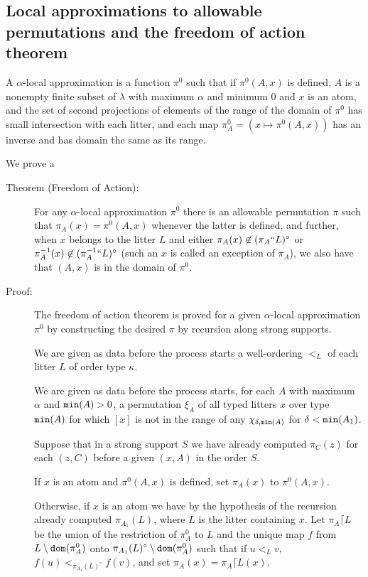 \documentclass[12pt]{article}
\begin{document}
\subsection{Local approximations to allowable permutations and the freedom of action theorem}

A $\alpha$-local approximation is a function $\pi^0$ such that if $\pi^0(A,x)$ is defined, $A$ is a nonempty finite subset of $\lambda$ with maximum $\alpha$ and minimum 0 and $x$ is an atom, and the set of second projections of elements of the range of the domain of $\pi^0$ has small intersection with each litter, and each map $\pi^0_A = (x \mapsto \pi^0(A,x))$ has an inverse and has domain the same as its range.


We prove a
\begin{description}
\item[ Theorem (Freedom of Action):] For any $\alpha$-local approximation $\pi^0$ there is an allowable permutation $\pi$ such that $\pi_A(x) = \pi^0(A,x)$ whenever the latter is defined, and further, when $x$ belongs to the litter $L$ and either $\pi_A(x) \not\in (\pi_A``L)^\circ$ or $\pi_A^{-1}(x) \not\in (\pi_A^{-1}``L)^\circ$ (such an $x$ is called an exception of $\pi_A$), we also have that $(A,x)$ is in the domain of $\pi^0$.

\item[Proof:]  The freedom of action theorem is proved for a given $\alpha$-local approximation $\pi^0$ by constructing the desired $\pi$ by recursion along strong supports.

We are given as data before the process starts a well-ordering $<_L$ of each litter $L$ of order type $\kappa$.

We are given as data before the process starts, for each $A$ with maximum $\alpha$ and ${\tt min}(A) >0$, a permutation $\xi_A$ of all typed
litters $x$ over type ${\tt min}(A)$ for which $[x]$ is not in the range of any $\chi_{\delta,{\tt min}(A)}$ for $\delta<{\tt min}(A_1)$.


Suppose that in a strong support $S$ we have already computed $\pi_C(z)$ for each $(z,C)$ before a given $(x,A)$ in the order $S$.

If $x$ is an atom and $\pi^0(A,x)$ is defined, set $\pi_A(x)$ to $\pi^0(A,x)$.

Otherwise, if $x$ is an atom we have by the hypothesis of the recursion already computed $\pi_{A_1}(L)$, where $L$ is the litter containing $x$.  Let $\pi_A \lceil L$ be the union of the restriction of $\pi_{A}^0$ to $L$ and the unique map $f$
from $L \setminus {\tt dom}(\pi^0_A)$ onto $\pi_{A_1}(L)^{\circ}\setminus  {\tt dom}(\pi^0_A)$ such that if $u <_L v$, $f(u) <_{\pi_{A_1}(L)^\circ} f(v)$, and set $\pi_A(x)=\pi_A\lceil L(x)$.


\end{description}
\end{document}
